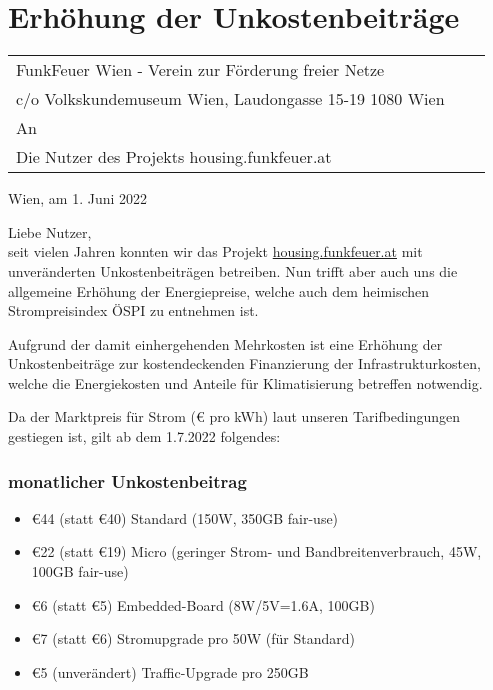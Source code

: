 \documentclass[parskip=half]{scrreprt}
\begin{document}
\vspace{4cm}
\chapter*{Erhöhung der Unkostenbeiträge}
\thispagestyle{fancy}

\begin{tabular}{p{8cm}p{}l}

	\vspace{1cm}

	{\scriptsize FunkFeuer Wien - Verein zur Förderung freier Netze}\\
	\vspace{-1em}
	{\scriptsize c/o Volkskundemuseum Wien, Laudongasse 15-19 1080 Wien}\\
	An\\
	Die Nutzer des Projekts housing.funkfeuer.at

\end{tabular}
\begin{flushright}
Wien, am 1. Juni 2022
\end{flushright}
\vspace{0.5cm}

Liebe Nutzer, \\

seit vielen Jahren konnten wir das Projekt \href{https://housing.funkfeuer.at}{housing.funkfeuer.at} mit unveränderten Unkostenbeiträgen betreiben. Nun trifft aber auch uns die allgemeine Erhöhung der Energiepreise, welche auch dem heimischen Strompreisindex ÖSPI zu entnehmen ist.

Aufgrund der damit einhergehenden Mehrkosten ist eine Erhöhung der Unkostenbeiträge zur kostendeckenden Finanzierung der Infrastrukturkosten, welche die Energiekosten und Anteile für Klimatisierung betreffen notwendig.

Da der Marktpreis für Strom (€ pro kWh) laut unseren Tarifbedingungen gestiegen ist, gilt ab dem 1.7.2022 folgendes:

\subsection*{monatlicher Unkostenbeitrag}
\begin{itemize}
	\item €44 (statt €40) Standard (150W, 350GB fair-use)
	\item €22 (statt €19) Micro (geringer Strom- und Bandbreitenverbrauch, 45W, 100GB fair-use)
	\item €6  (statt €5) Embedded-Board (8W/5V=1.6A, 100GB)
	\item €7  (statt €6) Stromupgrade pro 50W (für Standard)
	\item €5  (unverändert) Traffic-Upgrade pro 250GB
\end{itemize}
\end{document}
